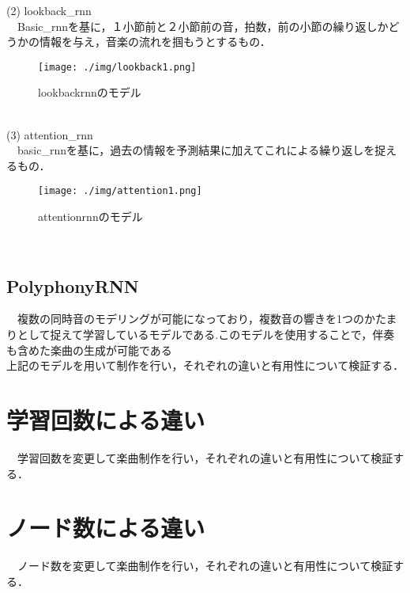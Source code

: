 \newpage
(2) lookback\_rnn\\
　Basic\_rnnを基に，１小節前と２小節前の音，拍数，前の小節の繰り返しかどうかの情報を与え，音楽の流れを掴もうとするもの．\\
\begin{figure}[!ht]
    \begin{screen}
    \begin{center}
        \texttt{[image: ./img/lookback1.png]}
        \caption{lookbackrnnのモデル}
        \label{fig:lookbackrnnのモデル}
    \end{center}
    \end{screen}
\end{figure}\\
\newpage
(3) attention\_rnn\\
　basic\_rnnを基に，過去の情報を予測結果に加えてこれによる繰り返しを捉えるもの．\\
\begin{figure}[!ht]
    \begin{screen}
    \begin{center}
        \texttt{[image: ./img/attention1.png]}
        \caption{attentionrnnのモデル}
        \label{fig:attentionrnnのモデル}
    \end{center}
    \end{screen}
\end{figure}\\
\subsection{PolyphonyRNN}
　複数の同時音のモデリングが可能になっており，複数音の響きを1つのかたまりとして捉えて学習しているモデルである.このモデルを使用することで，伴奏も含めた楽曲の生成が可能である\\
上記のモデルを用いて制作を行い，それぞれの違いと有用性について検証する．
\section{学習回数による違い}
　学習回数を変更して楽曲制作を行い，それぞれの違いと有用性について検証する．
\section{ノード数による違い}
　ノード数を変更して楽曲制作を行い，それぞれの違いと有用性について検証する．